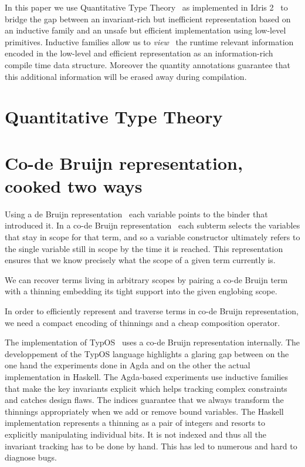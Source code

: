 \documentclass{article}
\newcommand{\typos}{TypOS}
\newcommand{\idris}{Idris 2}
\begin{document}
In this paper we use Quantitative Type
Theory~\cite{DBLP:conf/birthday/McBride16,DBLP:conf/lics/Atkey18}
as implemented in \idris{}~\cite{DBLP:conf/ecoop/Brady21} to bridge the gap between
an invariant-rich but inefficient representation based on an inductive family and
an unsafe but efficient implementation using low-level primitives.
%
Inductive families allow us to \emph{view}~\cite{DBLP:journals/jfp/McBrideM04} the
runtime relevant information encoded in the low-level and efficient representation
as an information-rich compile time data structure. Moreover the quantity annotations
guarantee that this additional information will be erased away during compilation.

\section{Quantitative Type Theory}

\section{Co-de Bruijn representation, cooked two ways}

Using a de Bruijn representation~\cite{MANUAL:journals/math/debruijn72} each variable
points to the binder that introduced it. In a co-de Bruijn
representation~\cite{DBLP:journals/corr/abs-1807-04085} each subterm
selects the variables that stay in scope for that term, and so a variable constructor
ultimately refers to the single variable still in scope by the time it is reached.
%
This representation ensures that we know precisely what the scope of a given term
currently is.

We can recover terms living in arbitrary scopes by pairing a co-de Bruijn term
with a thinning embedding its tight support into the given englobing scope.


In order to efficiently represent and traverse terms in co-de Bruijn representation,
we need a compact encoding of thinnings and a cheap composition operator.

The implementation of \typos~\cite{MANUAL:talk/types/Allais22} uses a co-de Bruijn
representation internally. 
%
The developpement of the \typos{} language highlights a glaring gap between on the
one hand the experiments done in Agda and on the other the actual implementation
in Haskell.
%
The Agda-based experiments use inductive families that make the key invariants explicit
which helps tracking complex constraints and catches design flaws. The indices guarantee
that we always transform the thinnings appropriately when we add or remove bound variables.
%
The Haskell implementation represents a thinning as a pair of integers and resorts to
explicitly manipulating individual bits. It is not indexed and thus all the invariant
tracking has to be done by hand. This has led to numerous and hard to diagnose bugs.
\end{document}
